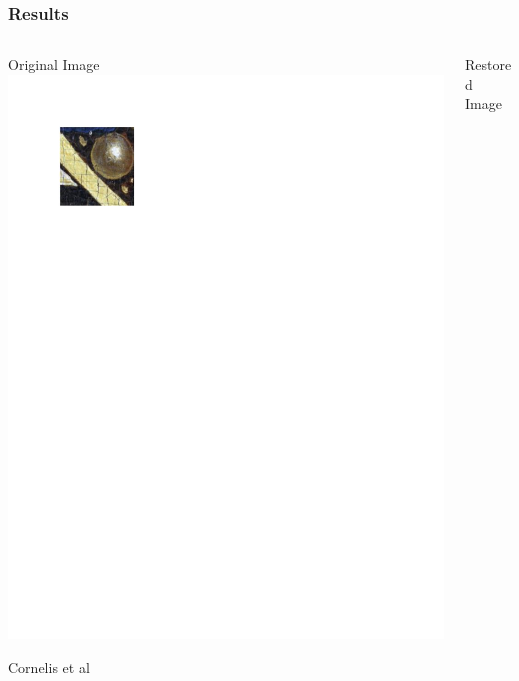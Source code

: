 \documentclass{beamer}
\begin{document}
\begin{frame}
\frametitle[Results]{Results}
\begin{columns}
\begin{column}{0.5\textwidth}
Original Image
\includegraphics[width=1\textwidth,trim={0.5in 8.4in 5.5in 0.75in},clip]{ghent_altarpiece_original}
\begin{center}
\tiny Cornelis et al
\end{center}
\end{column}
\begin{column}{0.5\textwidth}
Restored Image

\end{column}
\end{columns}
\end{frame}
\end{document}
